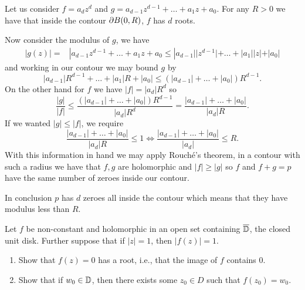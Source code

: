 \documentclass[12pt]{memoir}
\begin{document}
\begin{ptcbr}
    Let us consider $f=a_dz^d$ and $g=a_{d-1}z^{d-1}+\dots+a_1z+a_0$. For any $R>0$ we have that inside the contour $\partial B(0,R)$, $f$ has $d$ roots.\par 
    Now consider the modulus of $g$, we have
    \begin{align*}
        |g(z)|=&|a_{d-1}z^{d-1}+\dots+a_1z+a_0\leq|a_{d-1}||z^{d-1}|+\dots+|a_1||z|+|a_0|
    \end{align*}
    and working in our contour we may bound $g$ by 
    $$|a_{d-1}|R^{d-1}+\dots+|a_1|R+|a_0|\leq (|a_{d-1}|+\dots+|a_0|)R^{d-1}.$$
    On the other hand for $f$ we have $|f|=|a_d|R^d$ so 
    $$\frac{|g|}{|f|}\leq \frac{(|a_{d-1}|+\dots+|a_0|)R^{d-1}}{|a_d|R^d}=\frac{|a_{d-1}|+\dots+|a_0|}{|a_d|R}.$$
    If we wanted $|g|\leq |f|$, we require 
    $$\frac{|a_{d-1}|+\dots+|a_0|}{|a_d|R}\leq 1\iff \frac{|a_{d-1}|+\dots+|a_0|}{|a_d|}\leq R.$$
    With this information in hand we may apply Rouché's theorem, in a contour with such a radius we have that $f,g$ are holomorphic and $|f|\geq |g|$ so $f$ and $f+g=p$ have the same number of zeroes inside our contour.\par 
    In conclusion $p$ has $d$ zeroes all inside the contour which means that they have modulus less than $R$.
\end{ptcbr}

\begin{Ej}
    Let $f$ be non-constant and holomorphic in an open set containing $\overline {\mathbb{D}}$, the closed unit disk. Further suppose that if $|z| = 1$, then $| f (z)| = 1$.
    \begin{enumerate}
        \item Show that $f (z) = 0$ has a root, i.e., that the image of $f$ contains $0$. 
        \item Show that if $w_0\in \mathbb{D}$, then there exists some $z_0\in D$ such that $f(z_0)=w_0$. 
    \end{enumerate}
\end{Ej}
\end{document}
